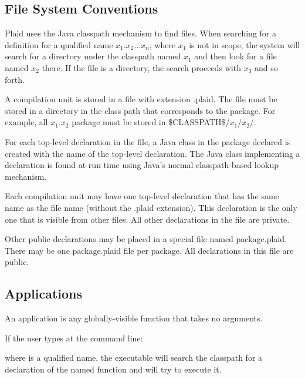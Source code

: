 
\subsection{File System Conventions}

Plaid uses the Java classpath mechanism to find files.  When searching
for a definition for a qualified name $x_1$.$x_2 \ldots x_n$, where $x_1$ is not in
scope, the system will search for a directory under the classpath
named $x_1$ and then look for a file named $x_2$ there.  If the file is a
directory, the search proceeds with $x_3$ and so forth.

A compilation unit is stored in a file with extension .plaid. The file must be stored in a directory in the class path that corresponds to the package. For example, all $x_1$.$x_2$ package must be stored in \$CLASSPATH\$/$x_1$/$x_2$/.

For each top-level declaration in the file, a Java class in the package declared
is created with the name of the top-level declaration.  The Java class
implementing a declaration is found at run time using Java's normal
classpath-based lookup mechanism.

Each compilation unit may have one top-level declaration that has the same
name as the file name (without the .plaid extension).  This declaration
is the only one that is visible from other files. All other declarations in the file are private.

Other public declarations may be placed in a special file named package.plaid. There may be one package.plaid file per package. All declarations in this file are public.





\subsection{Applications}

An application is any globally-visible function that takes no arguments.

\noindent
If the user types at the command line:

\begin{quote}
\end{quote}

\noindent
where  is a qualified name, the 
executable will search the classpath for a declaration of the named
function and will try to execute it.


